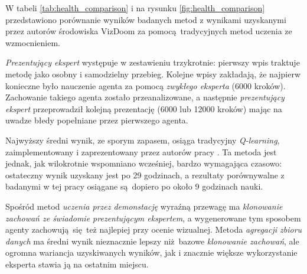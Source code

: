 W tabeli \ref{tab:health_comparison} i na rysunku \ref{fig:health_comparison} przedstawiono porównanie wyników badanych metod z wynikami uzyskanymi przez autorów środowiska VizDoom za pomocą tradycyjnych metod uczenia ze wzmocnieniem.

\begin{figure}[H]
\end{figure}

\textit{Prezentujący ekspert} występuje w zestawieniu trzykrotnie: pierwszy wpis traktuje metodę jako osobny i samodzielny przebieg. Kolejne wpisy zakładają, że najpierw konieczne było nauczenie agenta za pomocą \textit{zwykłego eksperta} (6000 kroków). Zachowanie takiego agenta zostało przeanalizowane, a następnie \textit{prezentujący ekspert} przeprowadził kolejną prezentację (6000 lub 12000 kroków) mając na uwadze błedy popełniane przez pierwszego agenta.

Najwyższy średni wynik, ze sporym zapasem, osiąga tradycyjny \textit{Q-learning}, zaimplementowany i zaprezentowany przez autorów pracy \cite{DBLP:journals/corr/KempkaWRTJ16}. Ta metoda jest jednak, jak wilokrotnie wspomniano wcześniej, bardzo wymagająca czasowo: ostateczny wynik uzyskany jest po 29 godzinach, a rezultaty porównywalne z badanymi w tej pracy osiągane są dopiero po około 9 godzinach nauki.

Spośród metod \textit{uczenia przez demonstację} wyraźną przewagę ma \textit{klonowanie zachowań ze świadomie prezentującym ekspertem}, a wygenerowane tym sposobem agenty zachowują się też najlepiej przy ocenie wizualnej. Metoda \textit{agregacji zbioru danych} ma średni wynik nieznacznie lepszy niż bazowe \textit{klonowanie zachowań}, ale ogromna wariancja uzyskiwanych wyników, jak i znacznie większe wykorzystanie eksperta stawia ją na ostatnim miejscu.

